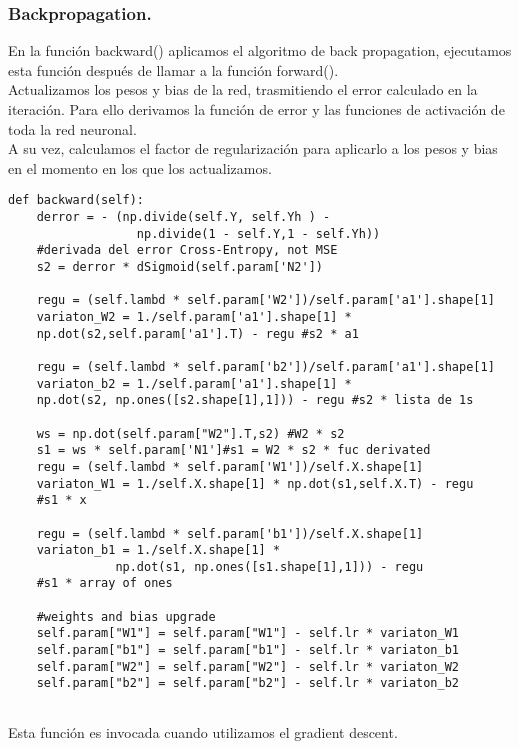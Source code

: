\documentclass[a4paper,11pt]{article}
\begin{document}
\subsubsection{Backpropagation.}

En la función backward() aplicamos el algoritmo de back propagation, ejecutamos esta función después de llamar a la función forward(). \\

\noindent
Actualizamos los pesos y bias de la red, trasmitiendo el error calculado en la iteración. Para ello derivamos la función de error y las funciones de activación de toda la red neuronal. \\

\noindent
A su vez, calculamos el factor de regularización para aplicarlo a los pesos y bias en el momento en los que los actualizamos.
\begin{lstlisting}
def backward(self):
    derror = - (np.divide(self.Y, self.Yh ) - 
                  np.divide(1 - self.Y,1 - self.Yh))
    #derivada del error Cross-Entropy, not MSE
    s2 = derror * dSigmoid(self.param['N2']) 

    regu = (self.lambd * self.param['W2'])/self.param['a1'].shape[1]
    variaton_W2 = 1./self.param['a1'].shape[1] *
    np.dot(s2,self.param['a1'].T) - regu #s2 * a1

    regu = (self.lambd * self.param['b2'])/self.param['a1'].shape[1]
    variaton_b2 = 1./self.param['a1'].shape[1] * 
    np.dot(s2, np.ones([s2.shape[1],1])) - regu #s2 * lista de 1s

    ws = np.dot(self.param["W2"].T,s2) #W2 * s2                    
    s1 = ws * self.param['N1']#s1 = W2 * s2 * fuc derivated      
    regu = (self.lambd * self.param['W1'])/self.X.shape[1]
    variaton_W1 = 1./self.X.shape[1] * np.dot(s1,self.X.T) - regu
    #s1 * x

    regu = (self.lambd * self.param['b1'])/self.X.shape[1]
    variaton_b1 = 1./self.X.shape[1] * 
               np.dot(s1, np.ones([s1.shape[1],1])) - regu 
    #s1 * array of ones 
    
    #weights and bias upgrade
    self.param["W1"] = self.param["W1"] - self.lr * variaton_W1 
    self.param["b1"] = self.param["b1"] - self.lr * variaton_b1 
    self.param["W2"] = self.param["W2"] - self.lr * variaton_W2 
    self.param["b2"] = self.param["b2"] - self.lr * variaton_b2
        
\end{lstlisting}
Esta función es invocada cuando utilizamos el gradient descent.
\end{document}
